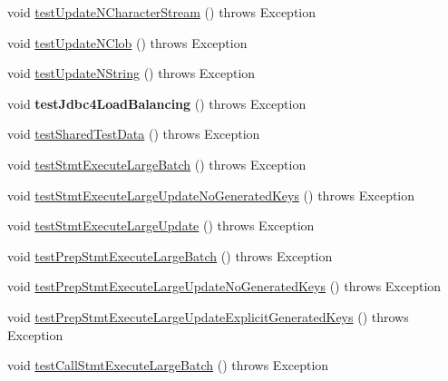 \begin{DoxyCompactItemize}
\item 
void \mbox{\hyperlink{classtestsuite_1_1simple_1_1_statements_test_a3d0a79f353f51403a5d7d3f0af149ad3}{test\+Update\+N\+Character\+Stream}} ()  throws Exception 
\item 
void \mbox{\hyperlink{classtestsuite_1_1simple_1_1_statements_test_a659cc0e7a3ffc297310c1397fd769983}{test\+Update\+N\+Clob}} ()  throws Exception 
\item 
void \mbox{\hyperlink{classtestsuite_1_1simple_1_1_statements_test_a4e41b5f592b49aa789051d554d859a7b}{test\+Update\+N\+String}} ()  throws Exception 
\item 
\mbox{\label{classtestsuite_1_1simple_1_1_statements_test_a42f2c236227da75b34af8254c907ce4f}} 
void {\bfseries test\+Jdbc4\+Load\+Balancing} ()  throws Exception 
\item 
void \mbox{\hyperlink{classtestsuite_1_1simple_1_1_statements_test_affafb967129c6b038a22a6fd14f36517}{test\+Shared\+Test\+Data}} ()  throws Exception 
\item 
void \mbox{\hyperlink{classtestsuite_1_1simple_1_1_statements_test_af89deb67acea573deb64576a0e66209f}{test\+Stmt\+Execute\+Large\+Batch}} ()  throws Exception 
\item 
void \mbox{\hyperlink{classtestsuite_1_1simple_1_1_statements_test_a749b7dc6b7d4433d4a9987c89cdfc059}{test\+Stmt\+Execute\+Large\+Update\+No\+Generated\+Keys}} ()  throws Exception 
\item 
void \mbox{\hyperlink{classtestsuite_1_1simple_1_1_statements_test_aa561c4a6b26c64026a884c9c9dd244a7}{test\+Stmt\+Execute\+Large\+Update}} ()  throws Exception 
\item 
void \mbox{\hyperlink{classtestsuite_1_1simple_1_1_statements_test_abb3b5923dd7282394306f43b0d98736d}{test\+Prep\+Stmt\+Execute\+Large\+Batch}} ()  throws Exception 
\item 
void \mbox{\hyperlink{classtestsuite_1_1simple_1_1_statements_test_aa679a99f5f5ae5968edee30a5c6f9c35}{test\+Prep\+Stmt\+Execute\+Large\+Update\+No\+Generated\+Keys}} ()  throws Exception 
\item 
void \mbox{\hyperlink{classtestsuite_1_1simple_1_1_statements_test_a05c4ee6dc645d6b2398c83f70f244ae4}{test\+Prep\+Stmt\+Execute\+Large\+Update\+Explicit\+Generated\+Keys}} ()  throws Exception 
\item 
void \mbox{\hyperlink{classtestsuite_1_1simple_1_1_statements_test_aefea78e355a622d7b5b0d79e11878cb7}{test\+Call\+Stmt\+Execute\+Large\+Batch}} ()  throws Exception 

\end{DoxyCompactItemize}
